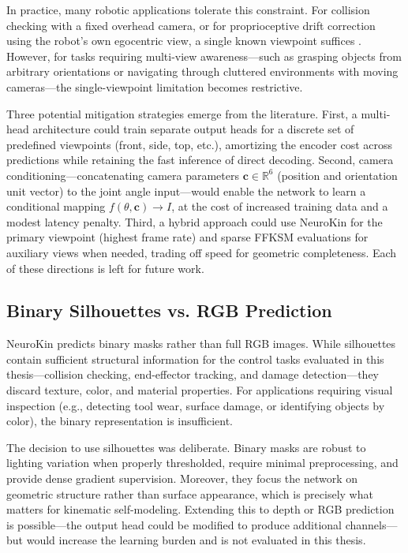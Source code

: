 \documentclass[12pt,a4paper,oneside]{report}
\begin{document}
In practice, many robotic applications tolerate this constraint. For collision checking with a fixed overhead camera, or for proprioceptive drift correction using the robot's own egocentric view, a single known viewpoint suffices \cite{hu2024teaching, chen2022full}. However, for tasks requiring multi-view awareness—such as grasping objects from arbitrary orientations or navigating through cluttered environments with moving cameras—the single-viewpoint limitation becomes restrictive.

Three potential mitigation strategies emerge from the literature. First, a multi-head architecture could train separate output heads for a discrete set of predefined viewpoints (front, side, top, etc.), amortizing the encoder cost across predictions while retaining the fast inference of direct decoding. Second, camera conditioning—concatenating camera parameters $\mathbf{c} \in \mathbb{R}^6$ (position and orientation unit vector) to the joint angle input—would enable the network to learn a conditional mapping $f(\theta, \mathbf{c}) \rightarrow I$, at the cost of increased training data and a modest latency penalty. Third, a hybrid approach could use NeuroKin for the primary viewpoint (highest frame rate) and sparse FFKSM evaluations for auxiliary views when needed, trading off speed for geometric completeness. Each of these directions is left for future work.

\subsection{Binary Silhouettes vs. RGB Prediction}
\label{subsec:binary_silhouettes_vs_rgb_prediction_main}

NeuroKin predicts binary masks rather than full RGB images. While silhouettes contain sufficient structural information for the control tasks evaluated in this thesis—collision checking, end-effector tracking, and damage detection—they discard texture, color, and material properties. For applications requiring visual inspection (e.g., detecting tool wear, surface damage, or identifying objects by color), the binary representation is insufficient.

The decision to use silhouettes was deliberate. Binary masks are robust to lighting variation when properly thresholded, require minimal preprocessing, and provide dense gradient supervision. Moreover, they focus the network on geometric structure rather than surface appearance, which is precisely what matters for kinematic self-modeling. Extending this to depth or RGB prediction is possible—the output head could be modified to produce additional channels—but would increase the learning burden and is not evaluated in this thesis.
\end{document}
